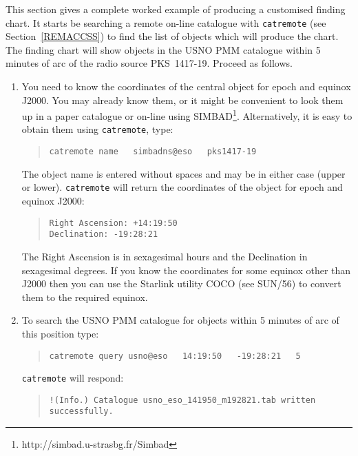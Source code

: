 \documentclass[twoside,11pt]{article}
\newcommand{\htmladdnormallinkfoot}[2]{#1\footnote{#2}}
\renewcommand{\_}{\texttt{\symbol{95}}}
\begin{document}
This section gives a complete worked example of producing a customised
finding chart.  It starts be searching a remote on-line catalogue with
{\tt catremote} (see Section~\ref{REMACCSS}) to find the list of objects
which will produce the chart.  The finding chart will show objects in the
USNO PMM catalogue\cite{PMM} within 5 minutes of arc of the radio source
PKS~1417-19.  Proceed as follows.

\begin{enumerate}

  \item You need to know the coordinates of the central object for epoch
   and equinox J2000.  You may already know them, or it might be
   convenient to look them up in a paper catalogue or on-line using
   \htmladdnormallinkfoot{SIMBAD}{http://simbad.u-strasbg.fr/Simbad}.
   Alternatively, it is easy to obtain them using {\tt catremote}, type:

  \begin{verse}
   {\tt catremote name ~ simbad\_ns@eso ~ pks1417-19}
  \end{verse}

   The object name is entered without spaces and may be in either case
   (upper or lower).  {\tt catremote} will return the coordinates of
   the object for epoch and equinox J2000:

  \begin{verse}
   {\tt Right Ascension: +14:19:50 \\
   Declination: -19:28:21}
  \end{verse}

   The Right Ascension is in sexagesimal hours and the Declination in
   sexagesimal degrees.  If you know the coordinates for some equinox other
   than J2000 then you can use the Starlink utility COCO (see
   SUN/56\cite{SUN56}) to convert them to the required equinox.

  \item To search the USNO PMM catalogue\cite{PMM} for objects within
   5 minutes of arc of this position type:

  \begin{verse}
   {\tt catremote query usno@eso ~ 14:19:50 ~ -19:28:21 ~ 5}
  \end{verse}

   {\tt catremote} will respond:

  \begin{verse}
   \verb-!(Info.) Catalogue usno_eso_141950_m192821.tab written successfully.-
  \end{verse}


\end{enumerate}
\end{document}
